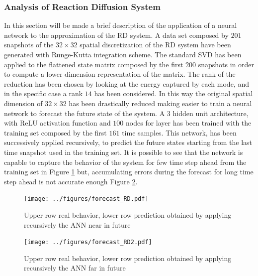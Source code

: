 \documentclass[]{article}
\begin{document}
\subsubsection{Analysis of Reaction Diffusion System}
In this section will be made a brief description of the application of a neural network to the approximation of the RD system. A data set composed by $201$ snapshots of the $32 \times 32$ spatial discretization of the RD system have been generated with Runge-Kutta integration scheme. The standard SVD has been applied to the flattened state matrix composed by the first $200$ snapshots in order to compute a lower dimension representation of the matrix. The rank of the reduction has been chosen by looking at the energy captured by each mode, and in the specific case a rank $14$ has been considered. In this way the original spatial dimension of $32 \times 32$ has been drastically reduced making easier to train a neural network to forecast the future state of the system. A $3$ hidden unit architecture, with ReLU activation function and $100$ nodes for layer has been trained with the training set composed by the first $161$ time samples. This network, has been successively applied recursively, to predict the future states starting from the last time snapshot used in the training set. It is possible to see that the network is capable to capture the behavior of the system for few time step ahead from the training set in Figure \ref{fig:fig10} but, accumulating errors during the forecast for long time step ahead is not accurate enough Figure \ref{fig:fig11}.
\begin{figure}[!b]
	\centering
	\texttt{[image: ../figures/forecast\_RD.pdf]}
	\caption{Upper row real behavior, lower row prediction obtained by applying recursively the ANN near in future}
	\label{fig:fig10}
\end{figure}
\begin{figure}[!t]
	\centering
	\texttt{[image: ../figures/forecast\_RD2.pdf]}
	\caption{Upper row real behavior, lower row prediction obtained by applying recursively the ANN far in future}
	\label{fig:fig11}
\end{figure}
\end{document}
